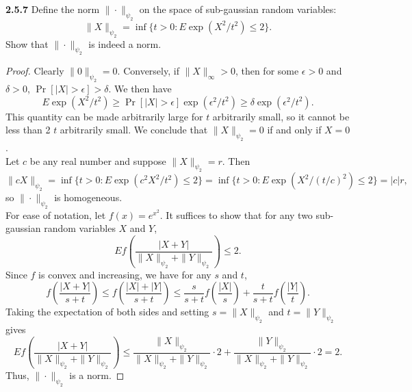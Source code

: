 \documentclass[11pt,letterpaper]{report}
\newcommand{\subg}[1]{\|{#1}\|_{\psi_2}}
\begin{document}
\noindent\textbf{2.5.7}
Define the norm $\subg{\cdot}$ on the space of sub-gaussian random variables:
\[
\subg{X} = \inf\{t>0: E\exp(X^2/t^2)\leq 2\}.
\]
Show that $\subg{\cdot}$ is indeed a norm.
\begin{proof}
	Clearly $\subg{0} = 0$. Conversely, if $\|X\|_\infty > 0$, then for some $\epsilon>0$ and $\delta>0$, $\Pr[|X|>\epsilon] > \delta$. We then have
	\[
	E\exp(X^2/t^2) \geq \Pr[|X|>\epsilon]\exp(\epsilon^2/t^2)\geq \delta \exp(\epsilon^2/t^2).
	\]
	This quantity can be made arbitrarily large for $t$ arbitrarily small, so it cannot be less than 2 $t$ arbitrarily small. We conclude that $\subg{X} = 0$ if and only if $X = 0$.\\

	Let $c$ be any real number and suppose $\subg{X} = r$. Then
	\[
	\subg{cX} = \inf\{t>0: E\exp(c^2X^2/t^2)\leq 2\} = \inf\{t>0: E\exp(X^2/(t/c)^2)\leq 2\} = |c|r,
	\]
	so $\subg{\cdot}$ is homogeneous.\\

	For ease of notation, let $f(x) = e^{x^2}$. It suffices to show that for any two sub-gaussian random variables $X$ and $Y$,
	\begin{equation}\label{2.5.7: tri}
		Ef\left( \frac{|X+Y|}{\subg{X}+\subg{Y}}\right)\leq 2.
	\end{equation}
	Since $f$ is convex and increasing, we have for any $s$ and $t$,
	\[
	f\left(\frac{|X+Y|}{s+t}\right)\leq f\left(\frac{|X|+|Y|}{s+t}\right) \leq \frac{s}{s+t}f\left(\frac{|X|}{s}\right) + \frac{t}{s+t}f\left(\frac{|Y|}{t}\right).
	\]
	Taking the expectation of both sides and setting $s = \subg{X}$ and $t= \subg{Y}$ gives
	\[
	Ef\left(\frac{|X+Y|}{\subg{X}+\subg{Y}}\right) \leq \frac{\subg{X}}{\subg{X}+\subg{Y}}\cdot 2 + \frac{\subg{Y}}{\subg{X}+\subg{Y}}\cdot 2 = 2.
	\]
	Thus, $\subg{\cdot}$ is a norm.
\end{proof}
\end{document}
